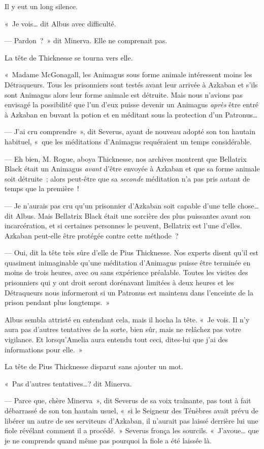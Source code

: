 Il y eut un long silence.

«~Je vois… dit Albus avec difficulté.

--- Pardon~?~»
dit Minerva.
Elle ne comprenait pas.

La tête de Thicknesse se tourna vers elle.

«~Madame McGonagall, les Animagus sous forme animale intéressent moins les Détraqueurs.
Tous les prisonniers sont testés avant leur arrivée à Azkaban et s'ils sont Animagus alors leur forme animale est détruite.
Mais nous n'avions pas envisagé la possibilité que l'un d'eux puisse devenir un Animagus \emph{après} être entré à Azkaban en buvant la potion et en méditant sous la protection d'un Patronus…

--- J'ai cru comprendre~», dit Severus, ayant de nouveau adopté son ton hautain habituel, «~que les méditations d'Animagus requéraient un temps considérable.

--- Eh bien, M. Rogue, aboya Thicknesse, nos archives montrent que Bellatrix Black était un Animagus \emph{avant} d'être envoyée à Azkaban et que sa forme animale soit détruite~; alors peut-être que sa \emph{seconde} méditation n'a pas pris autant de temps que la première~!

--- Je n'aurais pas cru qu'un prisonnier d'Azkaban soit capable d'une telle chose… dit Albus.
Mais Bellatrix Black était une sorcière des plus puissantes avant son incarcération, et si certaines personnes le peuvent, Bellatrix est l'une d'elles.
Azkaban peut-elle être protégée contre cette méthode~?

--- Oui, dit la tête très sûre d'elle de Pius Thicknesse.
Nos experts disent qu'il est quasiment inimaginable qu'une méditation d'Animagus puisse être terminée en moins de trois heures, avec ou sans expérience préalable.
Toutes les visites des prisonniers qui y ont droit seront dorénavant limitées à deux heures et les Détraqueurs nous informeront si un Patronus est maintenu dans l'enceinte de la prison pendant plus longtemps.~»

Albus sembla attristé en entendant cela, mais il hocha la tête.
«~Je vois.
Il n'y aura pas d'autres tentatives de la sorte, bien sûr, mais ne relâchez pas votre vigilance.
Et lorsqu'Amelia aura entendu tout ceci, dites-lui que j'ai des informations pour elle.~»

La tête de Pius Thicknesse disparut sans ajouter un mot.

«~Pas d'autres tentatives…? dit Minerva.

--- Parce que, chère Minerva~», dit Severus de sa voix traînante, pas tout à fait débarrassé de son ton hautain usuel, «~si le Seigneur des Ténèbres avait prévu de libérer un autre de ses serviteurs d'Azkaban, il n'aurait pas laissé derrière lui une fiole révélant comment il a procédé.~»
Severus fronça les sourcils.
«~J'avoue… que je ne comprends quand même pas pourquoi la fiole a été laissée là.

